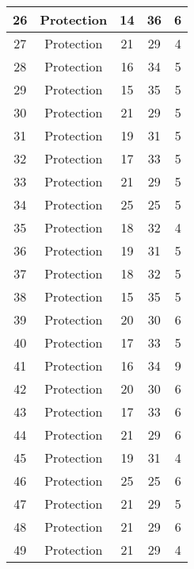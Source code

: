 \documentclass[results.tex]{subfiles}
\begin{document}
\begin{center}
\begin{tabular}{| c || c | c | c | c |}
    \hline
    26 & Protection & 14 & 36 & 6 \\ 
    \hline
    27 & Protection & 21 & 29 & 4 \\ 
    \hline
    28 & Protection & 16 & 34 & 5 \\ 
    \hline
    29 & Protection & 15 & 35 & 5 \\ 
    \hline
    30 & Protection & 21 & 29 & 5 \\ 
    \hline
    31 & Protection & 19 & 31 & 5 \\ 
    \hline
    32 & Protection & 17 & 33 & 5 \\ 
    \hline
    33 & Protection & 21 & 29 & 5 \\ 
    \hline
    34 & Protection & 25 & 25 & 5 \\ 
    \hline
    35 & Protection & 18 & 32 & 4 \\ 
    \hline
    36 & Protection & 19 & 31 & 5 \\ 
    \hline
    37 & Protection & 18 & 32 & 5 \\ 
    \hline
    38 & Protection & 15 & 35 & 5 \\ 
    \hline
    39 & Protection & 20 & 30 & 6 \\ 
    \hline
    40 & Protection & 17 & 33 & 5 \\ 
    \hline
    41 & Protection & 16 & 34 & 9 \\ 
    \hline
    42 & Protection & 20 & 30 & 6 \\ 
    \hline
    43 & Protection & 17 & 33 & 6 \\ 
    \hline
    44 & Protection & 21 & 29 & 6 \\ 
    \hline
    45 & Protection & 19 & 31 & 4 \\ 
    \hline
    46 & Protection & 25 & 25 & 6 \\ 
    \hline
    47 & Protection & 21 & 29 & 5 \\ 
    \hline
    48 & Protection & 21 & 29 & 6 \\ 
    \hline
    49 & Protection & 21 & 29 & 4 \\ 
    \hline   \end{tabular}
\end{center}
\end{document}
